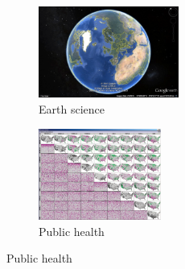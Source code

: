 \documentclass[
	fontsize=11pt
	headlines=2,
	footlines=2,
	parskip=half
]{scrartcl}
\begin{document}
{{			\newcommand{\applicationwidth}{0.32\textwidth}
			\newcommand{\applicationheight}{3cm}
			\begin{figure}[H]
				\centering
		        \begin{subfigure}[b]{\applicationwidth}
	                \includegraphics[width=\textwidth,height=\applicationheight]{images/earth-science}
	                \caption{Earth science \parencite{google2015earth}}
	                \label{fig:earth_science}
		        \end{subfigure}
		        \begin{subfigure}[b]{\applicationwidth}
	                \includegraphics[width=\textwidth,height=\applicationheight]{images/public-health}
	                	\caption{\tiny{Public health \parencite{maceachren2004geovisualization}}}

\end{subfigure}
\end{figure}}}
\end{document}
